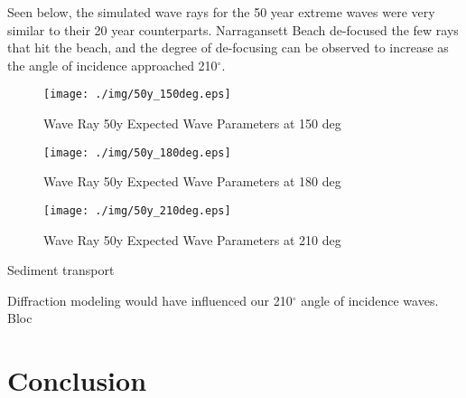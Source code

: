 
Seen below, the simulated wave rays for the 50 year extreme waves were very similar to their 20 year counterparts. Narragansett Beach de-focused the few rays that hit the beach, and the degree of de-focusing can be observed to increase as the angle of incidence approached 210$^{\circ}$.

\begin{figure}[H]
\centering
\texttt{[image: ./img/50y\_150deg.eps]}
\caption{Wave Ray 50y Expected Wave Parameters at 150 deg}
\label{fig:50y150deg}
\end{figure}

\begin{figure}[H]
\centering
\texttt{[image: ./img/50y\_180deg.eps]}
\caption{Wave Ray 50y Expected Wave Parameters at 180 deg}
\label{fig:50y180deg}
\end{figure}

\begin{figure}[H]
\centering
\texttt{[image: ./img/50y\_210deg.eps]}
\caption{Wave Ray 50y Expected Wave Parameters at 210 deg}
\label{fig:50y210deg}
\end{figure}

Sediment transport 


Diffraction modeling would have influenced our 210$^{\circ}$ angle of incidence waves. Bloc

\section{Conclusion}